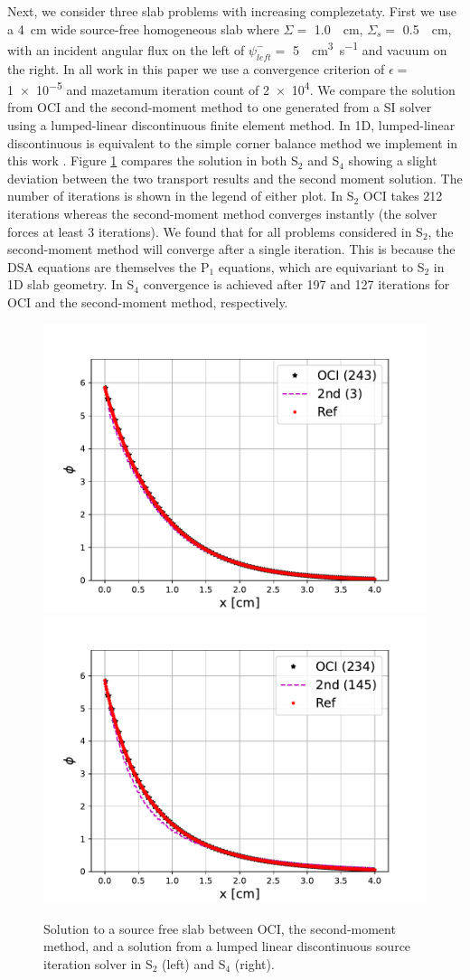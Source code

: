 Next, we consider three slab problems with increasing complezetaty.
First we use a \SI{4}{\centi\meter} wide source-free homogeneous slab where $\Sigma=$ \SI{1.0}{\per\centi\meter}, $\Sigma_s=$ \SI{0.5}{\per\centi\meter}, with an incident angular flux on the left of $\psi_{left}^-=$ \SI{5}{\per\centi\meter\cubed\per\s} and vacuum on the right.
In all work in this paper we use a convergence criterion of $\epsilon = $ \num{1e-5} and mazetamum iteration count of \num{2e4}.
We compare the solution from OCI and the second-moment method to one generated from a SI solver using a lumped-linear discontinuous finite element method.
In 1D, lumped-linear discontinuous is equivalent to the simple corner balance method we implement in this work \cite{adams_subcell_1997}.
Figure \ref{fig:regression_slab} compares the solution in both S$_2$ and S$_4$ showing a slight deviation between the two transport results and the second moment solution.
The number of iterations is shown in the legend of either plot.
In S$_2$ OCI takes 212 iterations whereas the second-moment method converges instantly (the solver forces at least 3 iterations).
We found that for all problems considered in S$_2$, the second-moment method will converge after a single iteration.
This is because the DSA equations are themselves the P$_1$ equations, which are equivariant to S$_2$ in 1D slab geometry.
In S$_4$ convergence is achieved after \num{197} and \num{127} iterations for OCI and the second-moment method, respectively.

\begin{figure}
    \centering
    \includegraphics[width=.49\linewidth]{figures/smm_paper/regression_slabs2.pdf}
    \includegraphics[width=.49\linewidth]{figures/smm_paper/regression_slabs4.pdf}
    \caption{Solution to a source free slab between OCI, the second-moment method, and a solution from a lumped linear discontinuous source iteration solver in S$_2$ (left) and S$_4$ (right).}
    \label{fig:regression_slab}
\end{figure}
 
